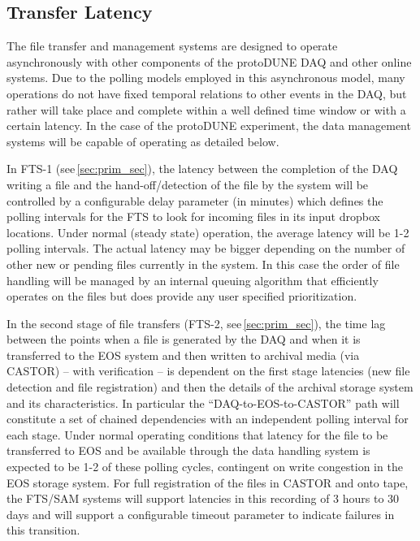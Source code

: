\documentclass[12pt]{article}
\newcommand{\pd}{protoDUNE\xspace}
\begin{document}
\subsection{Transfer Latency}
The file transfer and management systems are designed to operate asynchronously with other components of the \pd DAQ
and other online systems.
Due to the polling models employed in this asynchronous model, many operations do not have fixed temporal relations to other events in the DAQ,
but rather will take place and complete within a well defined time window or with a certain latency.  In the case of the \pd experiment,
the data management systems will be capable of operating as detailed below.

In FTS-1 (see\,\ref{sec:prim_sec}), the latency between the completion of the DAQ writing a file and the hand-off/detection of the file by the
system will be controlled by a configurable delay parameter (in minutes) which defines the polling intervals for the FTS
to look for  incoming files in its input dropbox locations.  Under normal (steady state) operation, the average latency will be 1-2 polling intervals.
The actual latency may be bigger depending on the number of other new or pending files currently in the system.
In this case the order of file handling will be managed by an internal queuing algorithm that efficiently operates on the files but
does provide any user specified prioritization.

In the second stage of file transfers (FTS-2, see\,\ref{sec:prim_sec}), the time lag between the points when a file is generated by the DAQ
and when it is transferred to the EOS
system and then written to archival media (via CASTOR) -- with verification --  is dependent on the first stage latencies (new file detection and file registration)
and then the details of the archival storage system and its characteristics.  In particular the ``DAQ-to-EOS-to-CASTOR'' path will constitute a set
of chained dependencies with an independent polling interval for each stage.  Under normal operating conditions that latency for the file to
be transferred to EOS and be available through the data handling system is expected to be 1-2 of these polling cycles, contingent on write
congestion in the EOS storage system.   For full registration of the files in CASTOR and onto tape, the FTS/SAM systems will support latencies
in this recording of 3 hours to 30 days and will support a configurable timeout parameter to indicate failures in this transition.
\end{document}
